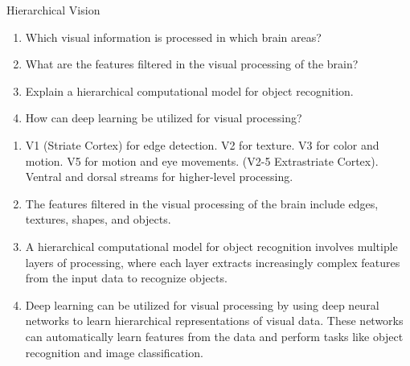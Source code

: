 \documentclass{article}
\begin{document}
\begin{exercise}{Hierarchical Vision}
  \begin{enumerate}
    \item Which visual information is processed in which brain areas? %
    \item What are the features filtered in the visual processing of the brain? %
    \item Explain a hierarchical computational model for object recognition.
    \item How can deep learning be utilized for visual processing?
  \end{enumerate}

  \begin{solution}
    \begin{enumerate}
      \item V1 (Striate Cortex) for edge detection. V2 for texture. V3 for color and motion. V5 for motion and eye movements. (V2-5 Extrastriate Cortex). Ventral and dorsal streams for higher-level processing.
      \item The features filtered in the visual processing of the brain include edges, textures, shapes, and objects.
      \item A hierarchical computational model for object recognition involves multiple layers of processing, where each layer extracts increasingly complex features from the input data to recognize objects.
      \item Deep learning can be utilized for visual processing by using deep neural networks to learn hierarchical representations of visual data. These networks can automatically learn features from the data and perform tasks like object recognition and image classification.
    \end{enumerate}
  \end{solution}
\end{exercise}
\end{document}
